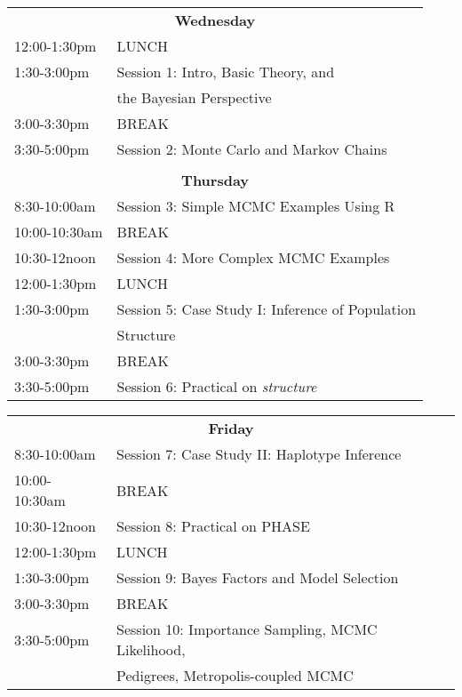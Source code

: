 \begin{tabular}{ll}
\multicolumn{2}{c}{\bf Wednesday}\\

12:00-1:30pm   &LUNCH\\
1:30-3:00pm      &Session 1: Intro, Basic Theory, and\\
                          &the Bayesian Perspective \\
3:00-3:30pm    &BREAK\\
3:30-5:00pm    &Session 2: Monte Carlo and Markov Chains\\
& \\
\multicolumn{2}{c}{\bf Thursday}\\

8:30-10:00am   &  Session 3: Simple MCMC Examples Using R\\
10:00-10:30am  &BREAK\\
10:30-12noon   & Session 4: More Complex MCMC Examples\\
12:00-1:30pm   &LUNCH\\
1:30-3:00pm      &  Session 5: Case Study I: Inference of Population \\
				&Structure\\
3:00-3:30pm    &BREAK\\
3:30-5:00pm    &  Session 6: Practical on {\em structure}\\
\end{tabular}



\es\bs
\begin{tabular}{ll}
\multicolumn{2}{c}{\bf Friday}\\
8:30-10:00am &Session 7: Case Study II: Haplotype Inference\\
10:00-10:30am  &BREAK\\
10:30-12noon   &Session 8: Practical on PHASE\\
12:00-1:30pm   &LUNCH\\
1:30-3:00pm      &Session 9: Bayes Factors and Model Selection\\
3:00-3:30pm    &BREAK\\
3:30-5:00pm    &Session 10: Importance Sampling, MCMC Likelihood, \\ & Pedigrees, 
				Metropolis-coupled MCMC\\
\end{tabular}





